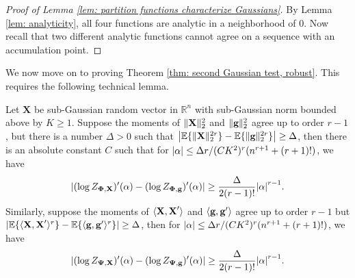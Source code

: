 \documentclass[final,12pt]{colt2018} %
\numberwithin{equation}{section}
\DeclarePairedDelimiter{\abs}{\lvert}{\rvert}
\DeclarePairedDelimiter{\norm}{\lVert}{\rVert}
\DeclarePairedDelimiter{\paren}{(}{)}
\DeclarePairedDelimiter{\braces}{\lbrace}{\rbrace}
\DeclarePairedDelimiter{\inprod}{\langle}{\rangle}
\newcommand{\E}{\mathbb{E}}
\newcommand{\R}{\mathbb{R}}
\newcommand{\boldg}{\textbf{g}}
\newcommand{\boldPhi}{\boldsymbol{\Phi}}
\newcommand{\boldPsi}{\boldsymbol{\Psi}}
\newcommand{\boldX}{\textbf{X}}
\begin{document}
\begin{proof}[Proof of Lemma \ref{lem: partition functions characterize Gaussians}]
	By Lemma \ref{lem: analyticity}, all four functions are analytic in a neighborhood of 0. Now recall that two different analytic functions cannot agree on a sequence with an accumulation point.
\end{proof}

We now move on to proving Theorem \ref{thm: second Gaussian test, robust}. This requires the following technical lemma.

\begin{lemma} \label{lem: second Gaussian test, robust lemma}
	Let $\boldX$ be sub-Gaussian random vector in $\R^n$ with sub-Gaussian norm bounded above by $K \geq 1$. Suppose the moments of $\norm{\boldX}_2^2$ and $\norm{\boldg}_2^2$ agree up to order $r-1$, but there is a number $\Delta > 0$ such that $\abs*{\E\braces{ \norm{\boldX}_2^{2r}} - \E\braces{ \norm{\boldg}_2^{2r}}} \geq \Delta$, then there is an absolute constant $C$ such that for $\abs{\alpha} \leq \Delta r/(CK^2)^r(n^{r+1}+(r+1)!)$, we have
	\begin{align} \label{CGF difference 1}
	\abs*{(\log Z_{\boldPhi,\boldX})'\paren*{\alpha}-(\log Z_{\boldPhi,\boldg})'\paren*{\alpha}} \geq \frac{\Delta}{2(r-1)!}\abs*{\alpha}^{r-1}.
	\end{align}
	Similarly, suppose the moments of $\inprod{\boldX,\boldX'}$ and $\inprod{\boldg,\boldg'}$ agree up to order $r-1$ but $\abs{\E\braces{ \inprod{\boldX,\boldX'}^r} - \E\braces{ \inprod{\boldg,\boldg'}^r}} \geq \Delta$, then for $\abs{\alpha} \leq \Delta r/(CK^2)^r(n^{r+1}+(r+1)!)$, we have
	\begin{align} \label{CGF difference 2}
	\abs*{(\log Z_{\boldPsi,\boldX})'\paren*{\alpha}-(\log Z_{\boldPsi,\boldg})'\paren*{\alpha}} \geq \frac{\Delta}{2(r-1)!}\abs*{\alpha}^{r-1}.
	\end{align}
\end{lemma}
\end{document}
